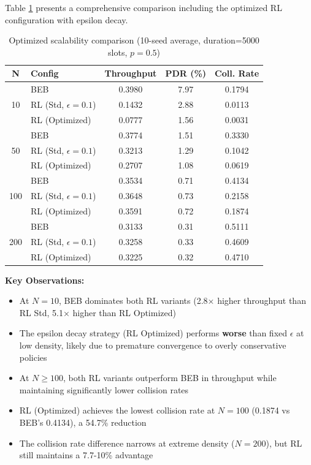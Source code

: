 \documentclass[12pt,a4paper,oneside]{article}
\theoremstyle{definition}
\begin{document}
Table \ref{tab:optimized_data} presents a comprehensive comparison including the optimized RL configuration with epsilon decay.

\begin{table}[H]
    \centering
    \small
    \begin{tabular}{|c|l|c|c|c|}
        \hline
        \textbf{N} & \textbf{Config} & \textbf{Throughput} & \textbf{PDR (\%)} & \textbf{Coll. Rate} \\
        \hline
        \multirow{3}{*}{10} 
        & BEB & 0.3980 & 7.97 & 0.1794 \\
        & RL (Std, $\epsilon=0.1$) & 0.1432 & 2.88 & 0.0113 \\
        & RL (Optimized) & 0.0777 & 1.56 & 0.0031 \\
        \hline
        \multirow{3}{*}{50} 
        & BEB & 0.3774 & 1.51 & 0.3330 \\
        & RL (Std, $\epsilon=0.1$) & 0.3213 & 1.29 & 0.1042 \\
        & RL (Optimized) & 0.2707 & 1.08 & 0.0619 \\
        \hline
        \multirow{3}{*}{100} 
        & BEB & 0.3534 & 0.71 & 0.4134 \\
        & RL (Std, $\epsilon=0.1$) & 0.3648 & 0.73 & 0.2158 \\
        & RL (Optimized) & 0.3591 & 0.72 & 0.1874 \\
        \hline
        \multirow{3}{*}{200} 
        & BEB & 0.3133 & 0.31 & 0.5111 \\
        & RL (Std, $\epsilon=0.1$) & 0.3258 & 0.33 & 0.4609 \\
        & RL (Optimized) & 0.3225 & 0.32 & 0.4710 \\
        \hline
    \end{tabular}
    \caption{Optimized scalability comparison (10-seed average, duration=5000 slots, $p=0.5$)}
    \label{tab:optimized_data}
\end{table}

\textbf{Key Observations:}
\begin{itemize}
    \item At $N=10$, BEB dominates both RL variants (2.8× higher throughput than RL Std, 5.1× higher than RL Optimized)
    \item The epsilon decay strategy (RL Optimized) performs \textbf{worse} than fixed $\epsilon$ at low density, likely due to premature convergence to overly conservative policies
    \item At $N \ge 100$, both RL variants outperform BEB in throughput while maintaining significantly lower collision rates
    \item RL (Optimized) achieves the lowest collision rate at $N=100$ (0.1874 vs BEB's 0.4134), a 54.7\% reduction
    \item The collision rate difference narrows at extreme density ($N=200$), but RL still maintains a 7.7-10\% advantage
\end{itemize}
\end{document}
